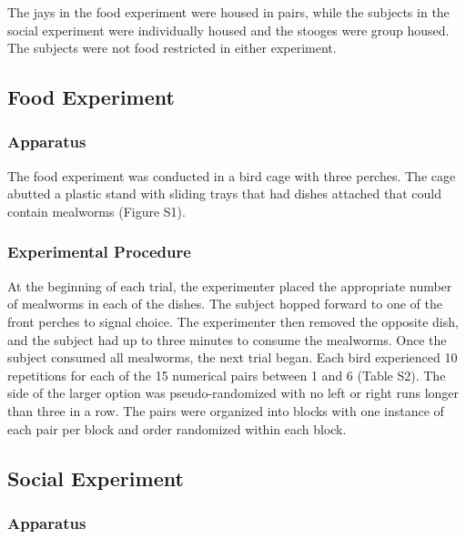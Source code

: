 \documentclass[
  ,doc,floatsintext]{apa6}
\begin{document}
The jays in the food experiment were housed in pairs, while the subjects in the social experiment were individually housed and the stooges were group housed. The subjects were not food restricted in either experiment.

\hypertarget{food-experiment}{%
\subsection{Food Experiment}\label{food-experiment}}

\hypertarget{apparatus}{%
\subsubsection{Apparatus}\label{apparatus}}

The food experiment was conducted in a bird cage with three perches. The cage abutted a plastic stand with sliding trays that had dishes attached that could contain mealworms (Figure S1).

\hypertarget{experimental-procedure}{%
\subsubsection{Experimental Procedure}\label{experimental-procedure}}

At the beginning of each trial, the experimenter placed the appropriate number of mealworms in each of the dishes. The subject hopped forward to one of the front perches to signal choice. The experimenter then removed the opposite dish, and the subject had up to three minutes to consume the mealworms. Once the subject consumed all mealworms, the next trial began.
Each bird experienced 10 repetitions for each of the 15 numerical pairs between 1 and 6 (Table S2). The side of the larger option was pseudo-randomized with no left or right runs longer than three in a row. The pairs were organized into blocks with one instance of each pair per block and order randomized within each block.

\hypertarget{social-experiment}{%
\subsection{Social Experiment}\label{social-experiment}}

\hypertarget{apparatus-1}{%
\subsubsection{Apparatus}\label{apparatus-1}}
\end{document}
